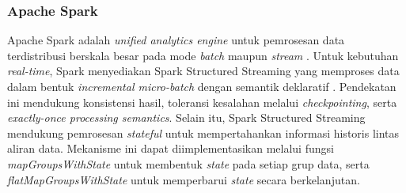 \subsubsection{Apache Spark}
Apache Spark adalah \textit{unified analytics engine} untuk pemrosesan data
terdistribusi berskala besar pada mode \textit{batch} maupun \textit{stream}
\cite{zaharia2016apachespark}. Untuk kebutuhan \textit{real-time}, Spark
menyediakan {Spark Structured Streaming} yang memproses data dalam
bentuk \textit{incremental micro-batch} dengan semantik deklaratif
\cite{zaharia2018structured}. Pendekatan ini mendukung konsistensi hasil,
toleransi kesalahan melalui \textit{checkpointing}, serta
\textit{exactly-once processing semantics}. Selain itu, Spark Structured
Streaming mendukung pemrosesan \textit{stateful} untuk mempertahankan
informasi historis lintas aliran data. Mekanisme ini dapat diimplementasikan
melalui fungsi \textit{mapGroupsWithState} untuk membentuk \textit{state}
pada setiap grup data, serta \textit{flatMapGroupsWithState} untuk
memperbarui \textit{state} secara berkelanjutan.




